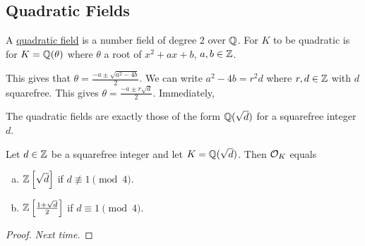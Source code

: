 \subsection{Quadratic Fields}
\begin{definition}
    A \ul{quadratic field} is a number field of degree $2$ over $\mathbb Q$. For $K$ to be quadratic is for $K = \mathbb Q(\theta)$ where $\theta$ a root of $x^2 + ax + b$, $a, b\in\mathbb Z$.
\end{definition}
This gives that $\theta = \frac{-a \pm \sqrt{a^2 - 4b}}{2}$. We can write $a^2 - 4b = r^2d$ where $r, d\in\mathbb Z$ with $d$ squarefree. This gives $\theta = \frac{-a\pm r\sqrt{d}}{2}$. Immediately,
\begin{proposition}
    The quadratic fields are exactly those of the form $\mathbb Q(\sqrt{d})$ for a squarefree integer $d$.
\end{proposition}
\begin{theorem}
    Let $d\in\mathbb Z$ be a squarefree integer and let $K = \mathbb Q(\sqrt{d})$. Then $\mathcal{O}_K$ equals
    \begin{enumerate}[a)]
        \item $\mathbb Z\left[\sqrt{d}\right]$ if $d\not\equiv 1\pmod{4}$.
        \item $\mathbb Z\left[\frac{1+\sqrt{d}}{2}\right]$ if $d\equiv 1\pmod{4}$.
    \end{enumerate}
\end{theorem}
\begin{proof}
    \emph{Next time}.
\end{proof}